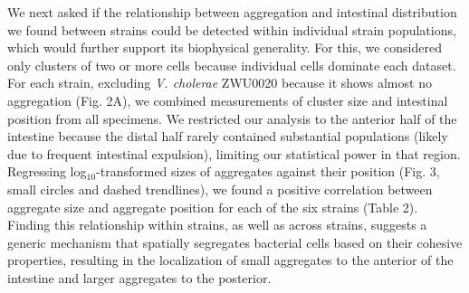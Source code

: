 We next asked if the relationship between aggregation and intestinal distribution we found between strains could be detected within individual strain populations, which would further support its biophysical generality. For this, we considered only clusters of two or more cells because individual cells dominate each dataset. For each strain, excluding \textit{V. cholerae} ZWU0020 because it shows almost no aggregation (Fig. 2A), we combined measurements of cluster size and intestinal position from all specimens. We restricted our analysis to the anterior half of the intestine because the distal half rarely contained substantial populations (likely due to frequent intestinal expulsion), limiting our statistical power in that region. Regressing log$_{10}$-transformed sizes of aggregates against their position (Fig. 3, small circles and dashed trendlines), we found a positive correlation between aggregate size and aggregate position for each of the six strains (Table 2). Finding this relationship within strains, as well as across strains, suggests a generic mechanism that spatially segregates bacterial cells based on their cohesive properties, resulting in the localization of small aggregates to the anterior of the intestine and larger aggregates to the posterior.






